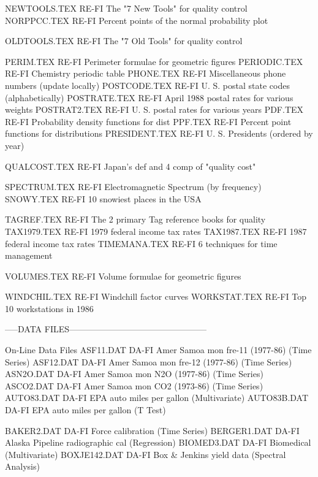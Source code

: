 NEWTOOLS.TEX                RE-FI The "7 New Tools" for quality control
NORPPCC.TEX                 RE-FI Percent points of the normal probability plot

OLDTOOLS.TEX                RE-FI The "7 Old Tools" for quality control

PERIM.TEX                   RE-FI Perimeter formulae for geometric figures
PERIODIC.TEX                RE-FI Chemistry periodic table
PHONE.TEX                   RE-FI Miscellaneous phone numbers (update locally)
POSTCODE.TEX                RE-FI U. S. postal state codes (alphabetically)
POSTRATE.TEX                RE-FI April 1988 postal rates for various weights
POSTRAT2.TEX                RE-FI U. S. postal rates for various years
PDF.TEX                     RE-FI Probability density functions for dist
PPF.TEX                     RE-FI Percent point functions for distributions
PRESIDENT.TEX               RE-FI U. S. Presidents (ordered by year)

QUALCOST.TEX                RE-FI Japan's def and 4 comp of "quality cost"

SPECTRUM.TEX                RE-FI Electromagnetic Spectrum (by frequency)
SNOWY.TEX                   RE-FI 10 snowiest places in the USA

TAGREF.TEX                  RE-FI The 2 primary Tag reference books for quality
TAX1979.TEX                 RE-FI 1979 federal income tax rates
TAX1987.TEX                 RE-FI 1987 federal income tax rates
TIMEMANA.TEX                RE-FI 6 techniques for time management

VOLUMES.TEX                 RE-FI Volume formulae for geometric figures

WINDCHIL.TEX                RE-FI Windchill factor curves
WORKSTAT.TEX                RE-FI Top 10 workstations in 1986

-----DATA FILES------------------------------------------------

On-Line Data Files
ASF11.DAT                   DA-FI Amer Samoa mon fre-11 (1977-86) (Time Series)
ASF12.DAT                   DA-FI Amer Samoa mon fre-12 (1977-86) (Time Series)
ASN2O.DAT                   DA-FI Amer Samoa mon N2O (1977-86) (Time Series)
ASCO2.DAT                   DA-FI Amer Samoa mon CO2 (1973-86) (Time Series)
AUTO83.DAT                  DA-FI EPA auto miles per gallon (Multivariate)
AUTO83B.DAT                 DA-FI EPA auto miles per gallon (T Test)

BAKER2.DAT                  DA-FI Force calibration (Time Series)
BERGER1.DAT                 DA-FI Alaska Pipeline radiographic cal (Regression)
BIOMED3.DAT                 DA-FI Biomedical (Multivariate)
BOXJE142.DAT                DA-FI Box & Jenkins yield data (Spectral Analysis)

